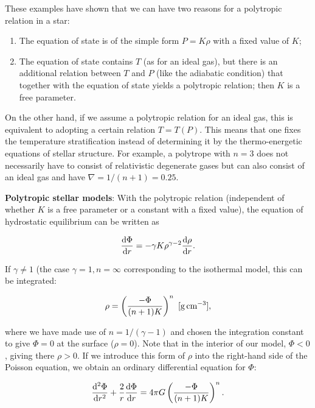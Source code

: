 \documentclass[a4paper,10pt]{article}
\begin{document}
{\noindent}These examples have shown that we can have two reasons for a polytropic relation in a star:
\begin{enumerate}
    \item The equation of state is of the simple form $P=K\rho$ with a fixed value of $K$;
    \item The equation of state contains $T$ (as for an ideal gas), but there is an additional relation between $T$ and $P$ (like the adiabatic condition) that together with the equation of state yields a polytropic relation; then $K$ is a free parameter.
\end{enumerate}

{\noindent}On the other hand, if we assume a polytropic relation for an ideal gas, this is equivalent to adopting a certain relation $T=T(P)$. This means that one fixes the temperature stratification instead of determining it by the thermo-energetic equations of stellar structure. For example, a polytrope with $n=3$ does not necessarily have to consist of relativistic degenerate gases but can also consist of an ideal gas and have $\nabla=1/(n+1)=0.25$.

{\noindent}\textbf{Polytropic stellar models}: With the polytropic relation (independent of whether $K$ is a free parameter or a constant with a fixed value), the equation of hydrostatic equilibrium can be written as

\begin{align*}
    \frac{{\rm d}\Phi}{{\rm d}r} = -\gamma K\rho^{\gamma-2} \frac{{\rm d}\rho}{{\rm d}r}.
\end{align*}

{\noindent}If $\gamma\neq1$ (the case $\gamma=1, n=\infty$ corresponding to the isothermal model, this can be integrated:

\begin{align*}
    \rho = \left( \frac{-\Phi}{(n+1)K} \right)^n ~ [{\rm g\,cm^{-3}}],
\end{align*}

{\noindent}where we have made use of $n=1/(\gamma-1)$ and chosen the integration constant to give $\Phi=0$ at the surface ($\rho=0$). Note that in the interior of our model, $\Phi<0$, giving there $\rho>0$. If we introduce this form of $\rho$ into the right-hand side of the Poisson equation, we obtain an ordinary differential equation for $\Phi$:

\begin{align*}
    \frac{{\rm d}^2\Phi}{{\rm d}r^2} + \frac{2}{r}\frac{{\rm d}\Phi}{{\rm d}r} = 4\pi G \left( \frac{-\Phi}{(n+1)K} \right)^n.
\end{align*}
\end{document}
